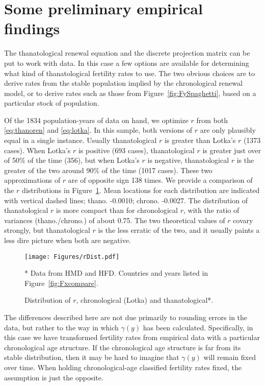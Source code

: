 \documentclass{article}
\begin{document}
\section*{Some preliminary empirical findings}
The thanatological renewal equation and the discrete projection matrix can be
put to work with data. In this case a few options are available for determining
what kind of thanatological fertility rates to use. The two obvious choices are
to derive rates from the stable population implied by the chronological renewal
model, or to derive rates such as those from Figure~\ref{fig:FySpaghetti},
based on a particular stock of population. 

Of the 1834 population-years of data on hand, we optimize $r$ from both
\eqref{eq:thanoren} and \eqref{eq:lotka}. In this sample, both versions of $r$
are only plausibly equal in a single instance. Usually thanatological $r$ is
greater than Lotka's $r$ (1373 cases). When Lotka's $r$ is positive (693 cases), thanatological $r$ is greater just over of 50\% of the time (356), but when Lotka's $r$ is negative,
thanatological $r$ is the greater of the two around 90\% of the time (1017
cases). These two approximations of $r$ are of opposite sign 138 times. We
provide a comparison of the $r$ distributions in Figure~\ref{fig:rDist}. Mean
locations for each distribution are indicated with vertical dashed lines; thano.
-0.0010; chrono. -0.0027. The distribution of thanatological $r$ is more compact
than for chronological $r$, with the ratio of variances (thano./chrono.) of
about 0.75. The two theoretical values of $r$ covary strongly, but
thanatological $r$ is the less erratic of the two, and it usually paints a less dire picture when both are negative.

\begin{figure}[h!]
	\caption{Distribution of $r$, chronological (Lotka) and thanatological*.}
	\begin{center}
		\label{fig:rDist}
		\texttt{[image: Figures/rDist.pdf]}
	\end{center}
	\begin{tiny}
     * Data from HMD and HFD. Countries and years listed in
     Figure~\ref{fig:Fxcompare}.
	\end{tiny}
\end{figure}

The differences described here are not due primarily to rounding errors in the
data, but rather to the way in which $\gamma(y)$ has been calculated. 
Specifically, in this case we have transformed fertility rates from empirical data with a particular
chronological age structure. If the chronological age structure is far from its
stable distribution, then it may be hard to imagine that $\gamma(y)$ will
remain fixed over time. When holding chronological-age classified fertility rates
fixed, the assumption is just the opposite.
\end{document}
